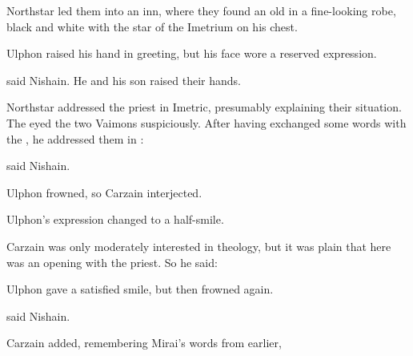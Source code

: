 \begin{comment}
\subsubsection{Ulphon Nestor}
\end{comment}

Northstar led them into an inn, where they found an old \dax{} in a fine-looking robe, black and white with the star of the Imetrium on his chest. 

Ulphon raised his hand in greeting, but his face wore a reserved expression. 

 said Nishain. 
He and his son raised their hands. 

Northstar addressed the priest in Imetric, presumably explaining their situation. 
The \Ispan{} eyed the two Vaimons suspiciously. 
After having exchanged some words with the \IlcSR{}, he addressed them in \Velcadian{}: 

 
 said Nishain. 

Ulphon frowned, so Carzain interjected. 

Ulphon's expression changed to a half-smile. 

Carzain was only moderately interested in theology, but it was plain that here was an opening with the priest. 
So he said: 

Ulphon gave a satisfied smile, but then frowned again. 

 said Nishain. 

 Carzain added, remembering Mirai's words from earlier, 

